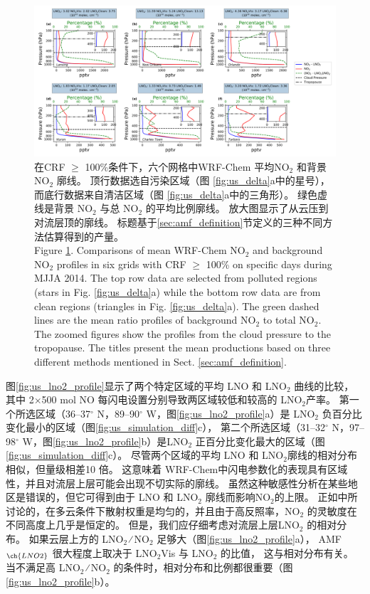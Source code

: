 \begin{figure}
\centering
\includegraphics[width=0.9\columnwidth]{./figures/us_bkgd_comp.png}%
\caption{在CRF $\geq$ 100\%条件下，六个网格中WRF-Chem 平均NO$_\textrm{2}$ 和背景 NO$_\textrm{2}$ 廓线。
顶行数据选自污染区域（图 \ref{fig:us_delta}a中的星号），而底行数据来自清洁区域（图 \ref{fig:us_delta}a中的三角形）。
绿色虚线是背景 NO$_\textrm{2}$ 与总 NO$_\textrm{2}$ 的平均比例廓线。
放大图显示了从云压到对流层顶的廓线。
标题基于\ref{sec:amf_definition}节定义的三种不同方法估算得到的产量。\\
Figure \ref{fig:us_bkgd_comp}. Comparisons of mean WRF-Chem NO$_\textrm{2}$ and background NO$_\textrm{2}$ profiles in six grids with CRF $\geq$ 100\% on specific days during MJJA 2014.
The top row data are selected from polluted regions (stars in Fig. \ref{fig:us_delta}a) while the bottom row data are from clean regions (triangles in Fig. \ref{fig:us_delta}a).
The green dashed lines are the mean ratio profiles of background NO$_\textrm{2}$ to total NO$_\textrm{2}$.
The zoomed figures show the profiles from the cloud pressure to the tropopause.
The titles present the mean productions based on three different methods mentioned in Sect. \ref{sec:amf_definition}.}
\label{fig:us_bkgd_comp}
\end{figure}


图\ref{fig:us_lno2_profile}显示了两个特定区域的平均 LNO 和 LNO$_2$ 曲线的比较，
其中 2$\times$500 mol NO 每闪电设置分别导致两区域较低和较高的 LNO$_2$产率。
第一个所选区域（36--37$^{\circ}$ N，89--90$^{\circ}$ W，图\ref{fig:us_lno2_profile}a）是 LNO$_2$ 负百分比变化最小的区域（图\ref{fig:us_simulation_diff}c），
第二个所选区域（31--32$^{\circ}$ N，97--98$^{\circ}$ W，图\ref{fig:us_lno2_profile}b）是LNO$_2$ 正百分比变化最大的区域（图\ref{fig:us_simulation_diff}c）。
尽管两个区域的平均 LNO 和 LNO$_2$廓线的相对分布相似，但量级相差10 倍。
这意味着 WRF-Chem中闪电参数化的表现具有区域性，并且对流层上层可能会出现不切实际的廓线。
虽然这种敏感性分析在某些地区是错误的，但它可得到由于 LNO 和 LNO$_2$ 廓线而影响NO$_2$的上限。
正如\citet{Laughner.2017}中所讨论的，在多云条件下散射权重是均匀的，并且由于高反照率，NO$_2$ 的灵敏度在不同高度上几乎是恒定的。
但是，我们应仔细考虑对流层上层LNO$_2$ 的相对分布。
如果云层上方的 LNO$_2$ ∕ NO$_2$ 足够大（图\ref{fig:us_lno2_profile}a），
AMF$_{\ch{LNO2}}$ 很大程度上取决于 LNO$_2$Vis 与 LNO$_2$ 的比值，
这与相对分布有关。
当不满足高 LNO$_2$ ∕ NO$_2$ 的条件时，相对分布和比例都很重要（图\ref{fig:us_lno2_profile}b）。


